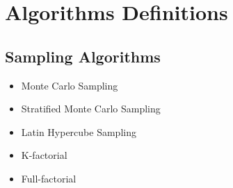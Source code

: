 \chapter{Algorithms Definitions}
\label{chapter:appendixA}


\section{Sampling Algorithms}
\begin{itemize}
\item Monte Carlo Sampling
\item Stratified Monte Carlo Sampling
\item Latin Hypercube Sampling
\item K-factorial
\item Full-factorial
\end{itemize}


